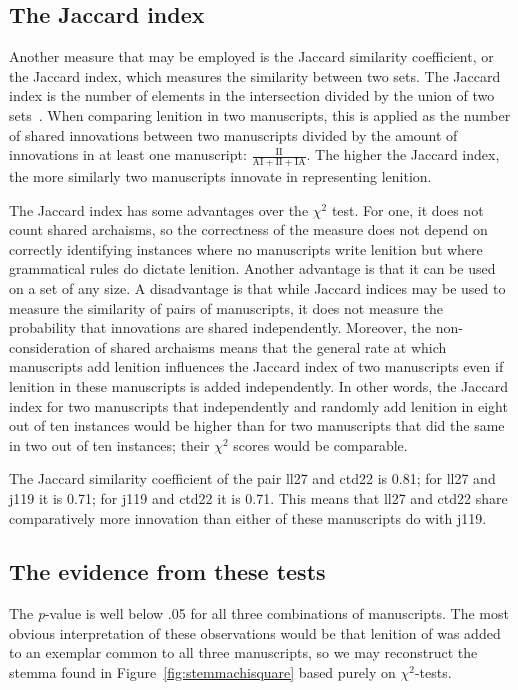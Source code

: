 \subsection{The Jaccard index}
\label{sec:jaccard-index}

Another measure that may be employed is the Jaccard similarity coefficient, or the Jaccard index, which measures the similarity between two sets. The Jaccard index is the number of elements in the intersection divided by the union of two sets~\autocite{LW_DistanceSets71}. When comparing lenition in two manuscripts, this is applied as the number of shared innovations between two manuscripts divided by the amount of innovations in at least one manuscript: \(\frac{\text{II}}{\text{AI}+\text{II}+\text{IA}}\). The higher the Jaccard index, the more similarly two manuscripts innovate in representing lenition.

The Jaccard index has some advantages over the \(\chi^2\) test. For one, it does not count shared archaisms, so the correctness of the measure does not depend on correctly identifying instances where no manuscripts write lenition but where grammatical rules do dictate lenition. Another advantage is that it can be used on a set of any size. A disadvantage is that while Jaccard indices may be used to measure the similarity of pairs of manuscripts, it does not measure the probability that innovations are shared independently. Moreover, the non-consideration of shared archaisms means that the general rate at which manuscripts add lenition influences the Jaccard index of two manuscripts even if lenition in these manuscripts is added independently. In other words, the Jaccard index for two manuscripts that independently and randomly add lenition in eight out of ten instances would be higher than for two manuscripts that did the same in two out of ten instances; their \(\chi^2\) scores would be comparable.

The Jaccard similarity coefficient of the pair \gls{ll27} and \gls{ctd22} is 0.81; for \gls{ll27} and \gls{j119} it is 0.71; for \gls{j119} and \gls{ctd22} it is 0.71. This means that \gls{ll27} and \gls{ctd22} share comparatively more innovation than either of these manuscripts do with \gls{j119}.

\subsection{The evidence from these tests}
\label{sec:evidence-from-these}

The \textit{p}-value is well below .05 for all three combinations of manuscripts. The most obvious interpretation of these observations would be that lenition of  was added to an exemplar common to all three manuscripts, so we may reconstruct the stemma found in Figure~\ref{fig:stemmachisquare} based purely on \(\chi^2\)-tests.

